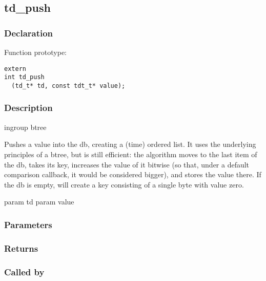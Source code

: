 
\newpage
\subsection{td\_push}
\subsubsection{Declaration} Function prototype:

\begin{verbatim}
extern
int td_push
  (td_t* td, const tdt_t* value);
\end{verbatim}

\subsubsection{Description}


 ingroup btree

 Pushes a value into the db, creating a (time) ordered list.
 It uses the underlying principles of a btree, but is still efficient:
 the algorithm moves to the last item of the db, takes its key,
 increases the value of it bitwise (so that, under a default comparison
 callback, it would be considered bigger), and stores the value there.
 If the db is empty, will create a key consisting of a single byte
 with value zero.

 param td
 param value
 

\subsubsection{Parameters}
\subsubsection{Returns}
\subsubsection{Called by}
